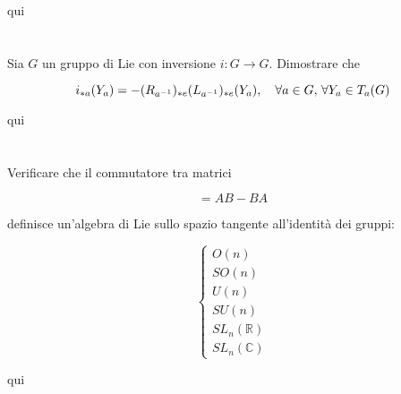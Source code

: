 qui

\tocless\section{}\label{es3-8}

\begin{tcolorbox}
		Sia $ G $ un gruppo di Lie con inversione $ i : G \to G $. Dimostrare che
	
	\begin{equation}
		i_{*a}(Y_{a}) = -(R_{a^{-1}})_{*e}(L_{a^{-1}})_{*e} (Y_{a}) \qcomma \forall a \in G, \, \forall Y_{a} \in T_{a}(G)
	\end{equation}
\end{tcolorbox}

qui

\tocless\section{}\label{es3-9}

\begin{tcolorbox}
	Verificare che il commutatore tra matrici
	
	\begin{equation}
		[A,B] = AB - BA
	\end{equation}

	definisce un'algebra di Lie sullo spazio tangente all'identità dei gruppi:
	
	\begin{equation}
		\begin{cases}
			O(n)\\
			SO(n)\\
			U(n)\\
			SU(n)\\
			SL_{n}(\mathbb{R})\\
			SL_{n}(\mathbb{C})
		\end{cases}
	\end{equation}
\end{tcolorbox}

qui

\tocless\section{}\label{es3-10}


